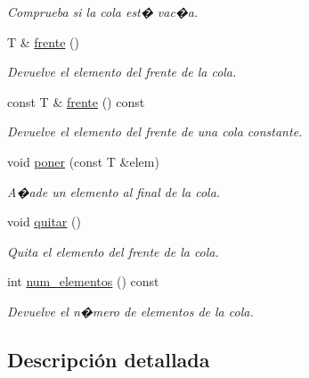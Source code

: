 \begin{DoxyCompactItemize}
\begin{DoxyCompactList}\small\item\em Comprueba si la cola est� vac�a. \end{DoxyCompactList}\item 
\mbox{\label{classCola_a1df4ad2b50116ef22e77ad3f77b02d29}} 
T \& \hyperlink{classCola_a1df4ad2b50116ef22e77ad3f77b02d29}{frente} ()
\begin{DoxyCompactList}\small\item\em Devuelve el elemento del frente de la cola. \end{DoxyCompactList}\item 
\mbox{\label{classCola_abd603daab25efd7131049f98ea09c175}} 
const T \& \hyperlink{classCola_abd603daab25efd7131049f98ea09c175}{frente} () const
\begin{DoxyCompactList}\small\item\em Devuelve el elemento del frente de una cola constante. \end{DoxyCompactList}\item 
void \hyperlink{classCola_a4a902e5805ae74f8d80c6f3267fd14c4}{poner} (const T \&elem)
\begin{DoxyCompactList}\small\item\em A�ade un elemento al final de la cola. \end{DoxyCompactList}\item 
\mbox{\label{classCola_a320766ddc7020424052c99e5c82a105d}} 
void \hyperlink{classCola_a320766ddc7020424052c99e5c82a105d}{quitar} ()
\begin{DoxyCompactList}\small\item\em Quita el elemento del frente de la cola. \end{DoxyCompactList}\item 
\mbox{\label{classCola_a26e5b0df5411aa23114d790f0a8c023b}} 
int \hyperlink{classCola_a26e5b0df5411aa23114d790f0a8c023b}{num\+\_\+elementos} () const
\begin{DoxyCompactList}\small\item\em Devuelve el n�mero de elementos de la cola. \end{DoxyCompactList}\end{DoxyCompactItemize}


\subsection{Descripción detallada}
